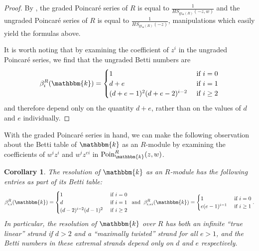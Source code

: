 \documentclass[12pt,reqno]{amsart}
\newtheorem{corollary}[theorem]{Corollary}
\theoremstyle{definition}
\theoremstyle{remark}
\newcommand{\grm}{\operatorname{gr_\frakm}}
\newcommand{\Poin}{\operatorname{Poin}}
\newcommand{\grmR}{{\grm(R)}}
\newcommand{\bbk}{\mathbbm{k}}
\newcommand{\frakm}{{\mathfrak{m}}}
\begin{document}
\begin{proof} 
By \cite[Corollary~5.6]{hrwTKoszulPropIAffSemigroupRings}, the graded Poincar\'e series of $R$ is equal to $\frac{1}{HS_{\grmR}(-z,w)}$ and the ungraded Poincar\'e series of $R$ is equal to $\frac{1}{HS_{\grmR}(-z)}$, manipulations which easily yield the formulas above. 

It is worth noting that by examining the coefficient of $z^i$ in the ungraded Poincar\'e series, we find that the ungraded Betti numbers are 
\[
\beta_i^R(\bbk) = \begin{cases}
1 &\text{ if } i=0 \\
d+e &\text{ if } i=1 \\
(d+e-1)^2(d+e-2)^{i-2} &\text{ if } i \geq 2
\end{cases}
\]
and therefore depend only on the quantity $d+e$, rather than on the values of $d$ and $e$ individually.  
\end{proof}

With the graded Poincar\'e series in hand, we can make the following observation about the Betti table of $\bbk$ as an $R$-module by examining the coefficients of $w^iz^i$ and $w^iz^{ei}$ in $\Poin_\bbk^R(z,w)$.

\begin{corollary}
\label{cor:bettitable}
The resolution of $\bbk$ as an $R$-module has the following entries as part of its Betti table: 
\[
\beta_{i,i}^R(\bbk) = \begin{cases}
1 & \text{ if } i=0\\
d & \text{ if } i=1\\
(d-2)^{i-2}(d-1)^2 & \text{ if } i \geq 2
\end{cases}
\: \text{ and } \: 
\beta_{i,ei}^R(\bbk) = \begin{cases}
1 & \text{ if } i=0\\
e(e-1)^{i-1} & \text{ if } i\geq 1
\end{cases}.
\]
In particular, the resolution of $\bbk$ over $R$ has both an infinite ``true linear'' strand if $d > 2$ and a ``maximally twisted'' strand for all $e>1$, and the Betti numbers in these extremal strands depend only on $d$ and $e$ respectively. 
\end{corollary}
\end{document}
